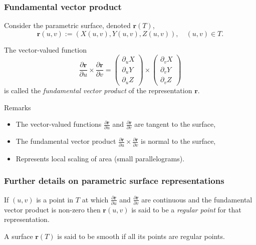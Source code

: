 \documentclass[aspectratio=169]{beamer}
\newcommand{\rr}{\mathbf{r}}
\begin{document}
\begin{frame}
    \frametitle{Fundamental vector product}

    Consider the parametric surface, denoted \(\rr(T)\),
    \[
        \rr(u,v) := \left(X(u,v),Y(u,v),Z(u,v)\right),
        \quad (u,v)\in T.
    \]

    \begin{definition}
        The vector-valued function
        \[
            \frac{\partial \rr}{\partial u} \times \frac{\partial \rr}{\partial v}
            = \left(\begin{smallmatrix}
                    \partial_{u} X \\ \partial_{u} Y \\ \partial_{u} Z
                \end{smallmatrix}\right)
            \times
            \left(\begin{smallmatrix}
                    \partial_{v} X \\ \partial_{v} Y \\ \partial_{v} Z
                \end{smallmatrix}\right)
        \]
        is called the \emph{fundamental vector product} of the representation \(\rr\).
    \end{definition}

    \begin{block}{Remarks}
        \begin{itemize}
            \item The vector-valued functions \(\frac{\partial \rr}{\partial u}\) and \(\frac{\partial \rr}{\partial v}\) are tangent to the surface,
            \item The fundamental vector product \(\frac{\partial \rr}{\partial u} \times \frac{\partial \rr}{\partial v}\) is normal to the surface,
            \item Represents local scaling of area (small parallelograms).
        \end{itemize}
    \end{block}

\end{frame}

\begin{frame}
    \frametitle{Further details on parametric surface representations}

    \begin{definition}
        If \((u,v)\) is a point in \(T\) at which \(\frac{\partial \rr}{\partial u}\) and \(\frac{\partial \rr}{\partial v}\) are continuous and the fundamental vector product is non-zero then \(\rr(u,v)\) is said to be a \emph{regular point} for that representation.
    \end{definition}

    \begin{definition}
        A surface \(\rr(T)\) is said to be smooth if all its points are regular points.
    \end{definition}



\end{frame}
\end{document}
